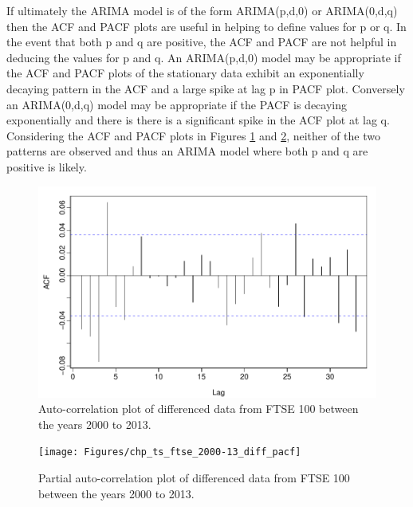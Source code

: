 If ultimately the ARIMA model is of the form ARIMA(p,d,0) or ARIMA(0,d,q) then the ACF and PACF plots are useful in helping to define values for p or q. In the event that both p and q are positive, the ACF and PACF are not helpful in deducing the values for p and q. An ARIMA(p,d,0) model may be appropriate if the ACF and PACF plots of the stationary data exhibit an exponentially decaying pattern in the ACF and a large spike at lag p in PACF plot. Conversely an ARIMA(0,d,q) model may be appropriate if the PACF is decaying exponentially and there is there is a significant spike in the ACF plot at lag q. Considering the ACF and PACF plots in Figures \ref{fig:chp_ts_ftse_2000-13_diff_acf} and \ref{fig:chp_ts_ftse_2000-13_diff_pacf}, neither of the two patterns are observed and thus an ARIMA model where both p and q are positive is likely.

\begin{figure}[tbh]
\centering
\includegraphics{Figures/chp_ts_ftse_2000-13_diff_acf}
\caption[ACF of FTSE 100 between the years 2000 to 2013]{Auto-correlation plot of differenced data from FTSE 100 between the years 2000 to 2013.}
\label{fig:chp_ts_ftse_2000-13_diff_acf}
\end{figure}

\begin{figure}[tbh]
\centering
\texttt{[image: Figures/chp\_ts\_ftse\_2000-13\_diff\_pacf]}
\caption[PACF of FTSE 100 between the years 2000 to 2013]{Partial auto-correlation plot of differenced data from FTSE 100 between the years 2000 to 2013.}
\label{fig:chp_ts_ftse_2000-13_diff_pacf}
\end{figure}

\textquotesingle\newpage
